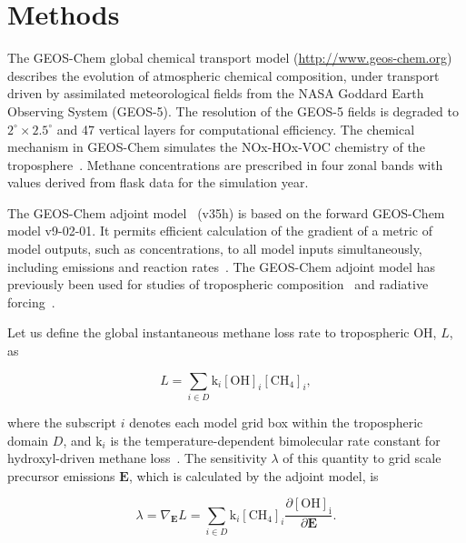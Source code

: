 \section{Methods}

The GEOS-Chem global chemical transport model (\url{http://www.geos-chem.org}) describes the evolution of atmospheric chemical composition, under transport driven by assimilated meteorological fields from the NASA Goddard Earth Observing System (GEOS-5). The resolution of the GEOS-5 fields is degraded to $2^{\circ} \times 2.5^{\circ}$ and 47 vertical layers for computational efficiency. The chemical mechanism in GEOS-Chem simulates the NOx-HOx-VOC chemistry of the troposphere~\citep{ref:mao2010}. Methane concentrations are prescribed in four zonal bands with values derived from flask data for the simulation year.


The GEOS-Chem adjoint model~\cite{ref:henze2007} (v35h) is based on the forward GEOS-Chem model v9-02-01. It permits efficient calculation of the gradient of a metric of model outputs, such as concentrations, to all model inputs simultaneously, including emissions and reaction rates~\cite{ref:paulot2012}. The GEOS-Chem adjoint model has previously been used for studies of tropospheric composition~\citep{ref:zhang2009,ref:walker2012} and radiative forcing~\citep{ref:bowman2012}.

Let us define the global instantaneous methane loss rate to tropospheric OH, $L$, as

\begin{equation}
L=\sum_{i \in D} \mathrm{k}_i \mathrm{[OH]}_i \mathrm{[CH_4]}_i,
\end{equation}

where the subscript $i$ denotes each model grid box within the tropospheric domain $D$, and $\mathrm{k}_i$ is the temperature-dependent bimolecular rate constant for hydroxyl-driven methane loss~\citep{ref:sander2011}. The sensitivity $\lambda$ of this quantity to grid scale precursor emissions $\mathbf{E}$, which is calculated by the adjoint model, is

\begin{equation}
\lambda = \nabla_\mathbf{E} L = \sum_{i \in D} \mathrm{k}_i \mathrm{[CH_4]}_i \frac{\partial \mathrm{[OH]_i}}{\partial \mathbf{E}}.
\end{equation}


